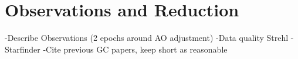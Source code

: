 \section{Observations and Reduction}
-Describe Observations (2 epochs around AO adjustment)
-Data quality Strehl
-Starfinder
-Cite previous GC papers, keep short as reasonable
